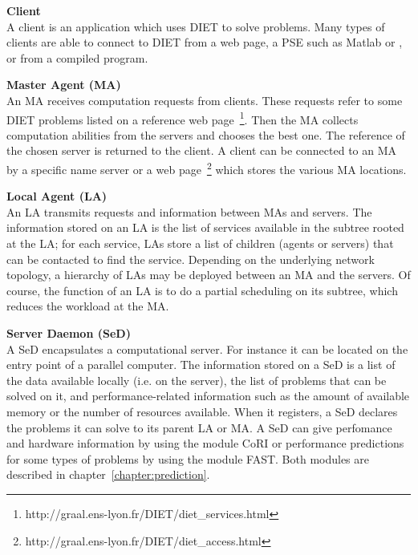 \begin{description}
\item \textbf{Client}\\
  A client is an application which uses DIET to solve problems.  Many
  types of clients are able to connect to DIET from a web page, a PSE
  such as Matlab or \sci, or from a compiled program.
\item \textbf{Master Agent (MA)}\\
  An MA receives computation requests from clients. These requests
  refer to some DIET problems listed on a reference web
  page~\footnote{http://graal.ens-lyon.fr/DIET/diet\_services.html}.
  Then the MA collects computation abilities from the servers and
  chooses the best one. The reference of the chosen server is returned
  to the client. A client can be connected to an MA by a specific name
  server or a web
  page~\footnote{http://graal.ens-lyon.fr/DIET/diet\_access.html}
  which stores the various MA locations.

\item \textbf{Local Agent (LA)}\\
  An LA transmits requests and information between MAs and servers.
  The information stored on an LA is the list of services available
  in the subtree rooted at the LA; for each service, LAs store a
  list of children (agents or servers) that can be contacted to find
  the service. Depending on the underlying
  network topology, a hierarchy of LAs may be deployed between an MA
  and the servers. Of course, the function of an LA is to do a partial
  scheduling on its subtree, which reduces the workload at the MA.

\item \textbf{Server Daemon (SeD)}\\
  A SeD encapsulates a computational server. For instance it can be
  located on the entry point of a parallel computer. The information
  stored on a SeD is a list of the data available locally (i.e. on
  the server), the list of problems
  that can be solved on it, and performance-related information such
  as the amount of available memory or the number of resources
  available. When it registers, a SeD declares the problems it can
  solve to its parent LA or MA.  A SeD can give perfomance and hardware
  information by using the module CoRI or performance
  predictions for some types of
  problems by using the module FAST.
  Both modules are described in chapter~\ref{chapter:prediction}.

\end{description}

